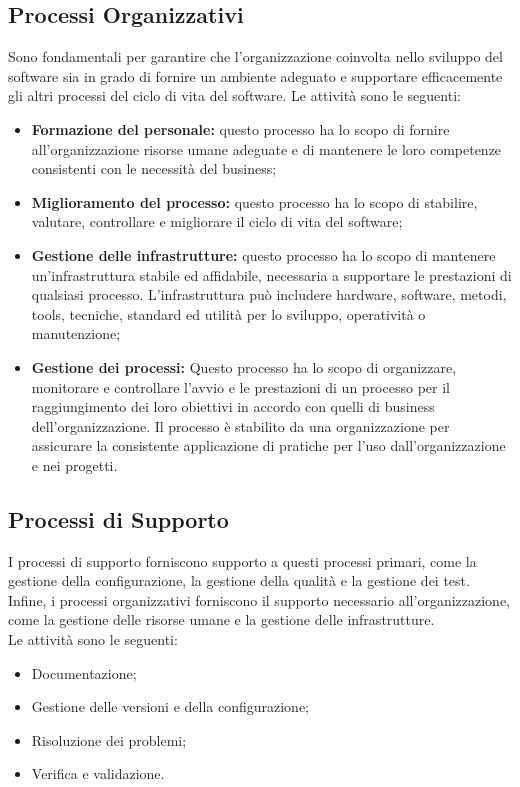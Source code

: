 \subsection{Processi Organizzativi}
Sono fondamentali per garantire che l'organizzazione coinvolta nello sviluppo del software sia in grado di fornire un ambiente adeguato e supportare efficacemente gli altri processi del ciclo di vita del software.
Le attività sono le seguenti:
\begin{itemize}
    \item \textbf{Formazione del personale:} questo processo ha lo scopo di fornire all'organizzazione risorse umane adeguate e di mantenere le loro competenze consistenti con le necessità del business;
    \item \textbf{Miglioramento del processo:} questo processo ha lo scopo di stabilire, valutare, controllare e migliorare il ciclo di vita del software;
    \item \textbf{Gestione delle infrastrutture:} questo processo ha lo scopo di mantenere un'infrastruttura stabile ed affidabile, necessaria a supportare le prestazioni di qualsiasi processo.
    L'infrastruttura può includere hardware, software, metodi, tools, tecniche, standard ed utilità per lo sviluppo, operatività o manutenzione;
    
    \item \textbf{Gestione dei processi:} Questo processo ha lo scopo di organizzare, monitorare e controllare l'avvio e le prestazioni di un processo per il raggiungimento dei loro obiettivi in accordo con quelli di business dell'organizzazione.
    Il processo è stabilito da una organizzazione per assicurare la consistente applicazione di pratiche per l'uso dall'organizzazione e nei progetti.
    
    
    
\end{itemize}

\subsection{Processi di Supporto}
I processi di supporto forniscono supporto a questi processi primari, come la gestione della configurazione, la gestione della qualità e la gestione dei test. Infine, i processi organizzativi forniscono il supporto necessario all'organizzazione, come la gestione delle risorse umane e la gestione delle infrastrutture.\\
Le attività sono le seguenti:
\begin{itemize}
    \item Documentazione;
    \item Gestione delle versioni e della configurazione;
    \item Risoluzione dei problemi;
    \item Verifica e validazione.
    
\end{itemize}

